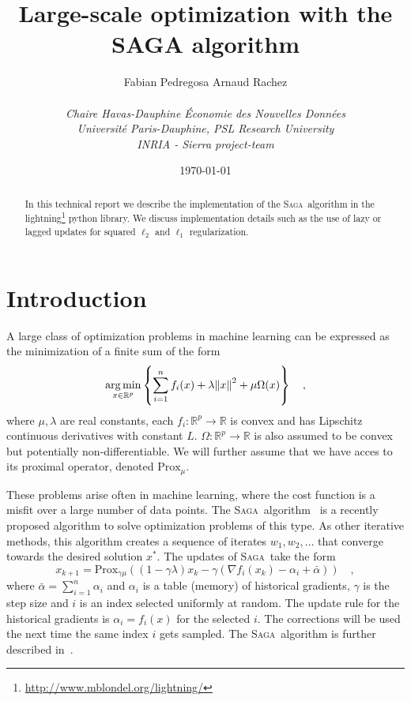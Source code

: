 \documentclass{scrartcl}
\title{Large-scale optimization with the \textsc{SAGA} algorithm}
\author{Fabian Pedregosa \qquad Arnaud Rachez \\\\
   \emph{Chaire Havas-Dauphine  \'Economie des Nouvelles Donn\'ees} \\
   \emph{Universit\'e Paris-Dauphine, PSL Research University} \\
    \emph{INRIA - Sierra project-team}
}
\date{\today} %
\DeclareMathOperator*{\argmin}{arg\,min}
\def\RR{{\mathbb R}}
\newcommand{\SAGA}{\textsc{Saga}}
\begin{document}
\maketitle


\begin{abstract}
In this technical report we describe the implementation of the \SAGA\ algorithm in the lightning\footnote{\url{http://www.mblondel.org/lightning/}} python library. We discuss implementation details such as the use of lazy or lagged updates for squared $\ell_2$ and $\ell_1$ regularization.
\end{abstract}

\section{Introduction}

A large class of optimization problems in machine learning can be expressed as the minimization of a finite sum of the form
$$
\argmin_{x \in \RR^p} \left\{ \sum_{i=1}^n f_i(x) + \lambda \norm{x}^2 + \mu \Omega(x)\right\} \quad,
$$
where $\mu, \lambda$ are real constants, each $f_i: \RR^p \to \RR$ is convex and has Lipschitz continuous derivatives with constant $L$. $\Omega: \RR^p \to \RR$ is also assumed to be convex but potentially non-differentiable. We will further assume that we have acces to its proximal operator, denoted $\text{Prox}_{\mu}$.

These problems arise often in machine learning, where the cost function is a misfit over a large number of data points. The \SAGA\ algorithm~\citep{defazio2014saga} is a recently proposed algorithm to solve optimization problems of this type. As other iterative methods, this algorithm creates a sequence of iterates $w_1, w_2, \ldots$ that converge towards the desired solution $x^*$. The updates of \SAGA\ take the form
\begin{equation} \label{eq:update_rule}
x_{k+1} = \text{Prox}_{\gamma \mu}((1 - \gamma \lambda)x_k - \gamma (\nabla f_i(x_k) - {\alpha}_i + \bar{\alpha})) \quad,
\end{equation}
where $\bar{\alpha} = \sum_{i=1}^n \alpha_i$ and $\alpha_i$ is a table (memory) of historical gradients, $\gamma$ is the step size and $i$ is an index selected uniformly at random. The update rule for the historical gradients is $\alpha_i = f_i(x)$ for the selected $i$. The corrections will be used the next time the same index $i$ gets sampled. The \SAGA\ algorithm is further described in~\citep{defazio2014saga,hofmann2015variance}.
\end{document}
